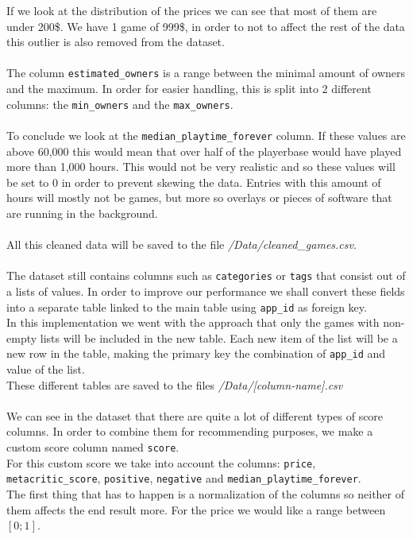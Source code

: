 \documentclass{article}
\begin{document}
	If we look at the distribution of the prices we can see that most of them are under 200\$. We have 1 game of 999\$, in order to not to affect the rest of the data this outlier is also removed from the dataset.\\
	\\
	The column \texttt{estimated\_owners} is a range between the minimal amount of owners and the maximum. In order for easier handling, this is split into 2 different columns: the \texttt{min\_owners} and the \texttt{max\_owners}.\\
	\\
	To conclude we look at the \texttt{median\_playtime\_forever} column. If these values are above 60,000 this would mean that over half of the playerbase would have played more than 1,000 hours. This would not be very realistic and so these values will be set to 0 in order to prevent skewing the data. Entries with this amount of hours will mostly not be games, but more so overlays or pieces of software that are running in the background.\\
	\\
	All this cleaned data will be saved to the file \textit{/Data/cleaned\_games.csv}.\\
	\\
	The dataset still contains columns such as \texttt{categories} or \texttt{tags} that consist out of a lists of values. In order to improve our performance we shall convert these fields into a separate table linked to the main table using \texttt{app\_id} as foreign key.\\
	In this implementation we went with the approach that only the games with non-empty lists will be included in the new table. Each new item of the list will be a new row in the table, making the primary key the combination of \texttt{app\_id} and value of the list.\\
	These different tables are saved to the files \textit{/Data/[column-name].csv}\\
	\\
	We can see in the dataset that there are quite a lot of different types of score columns. In order to combine them for recommending purposes, we make a custom score column named \texttt{score}.\\
	For this custom score we take into account the columns: \texttt{price}, \texttt{metacritic\_score}, \texttt{positive}, \texttt{negative} and \texttt{median\_playtime\_forever}.\\
	The first thing that has to happen is a normalization of the columns so neither of them affects the end result more. For the price we would like a range between $\left[0;1\right]$.
	
\end{document}
